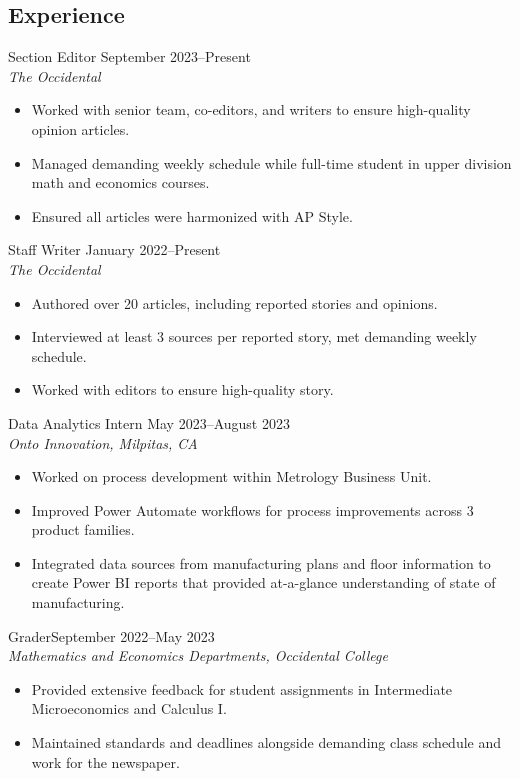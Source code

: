 \documentclass[margin, 12pt]{res} %
\begin{document}
\begin{resume}
\section{\sc Experience}
Section Editor \hfill September 2023--Present \\
\textit{The Occidental}
\begin{itemize}\itemsep -2pt
  \item Worked with senior team, co-editors, and writers to ensure high-quality opinion articles.
  \item Managed demanding weekly schedule while full-time student in upper division math and economics courses.
  \item Ensured all articles were harmonized with AP Style.
\end{itemize}
Staff Writer \hfill January 2022--Present \\
\textit{The Occidental} 
\begin{itemize} \itemsep -2pt
\item Authored over 20 articles, including reported stories and opinions.
\item Interviewed at least 3 sources per reported story, met demanding weekly schedule.
\item Worked with editors to ensure high-quality story.
\end{itemize} 
{Data Analytics Intern} \hfill May 2023--August 2023 \\
\textit{Onto Innovation, Milpitas, CA}
\begin{itemize} \itemsep -2pt %
\item Worked on process development within Metrology Business Unit.
\item Improved Power Automate workflows for process improvements across 3 product families.
\item Integrated data sources from manufacturing plans and floor information to create Power BI reports that provided at-a-glance understanding of state of manufacturing.
\end{itemize}
 


Grader\hfill September 2022--May 2023\\
\textit{Mathematics and Economics Departments, Occidental College}
\begin{itemize}\itemsep -2pt
  \item Provided extensive feedback for student assignments in Intermediate Microeconomics and Calculus I.
  \item Maintained standards and deadlines alongside demanding class schedule and work for the newspaper.
\end{itemize}


\end{resume}
\end{document}
